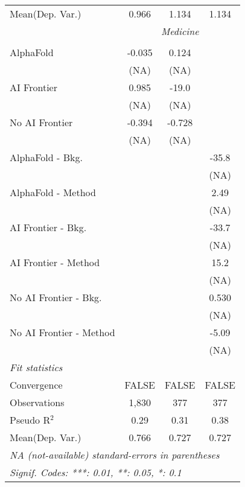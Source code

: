 \begin{tabular}{lccc}
Mean(Dep. Var.) & 0.966 & 1.134 & 1.134 \\
 & \multicolumn{3}{c}{\textit{Medicine}} \\ \\
   AlphaFold               & -0.035 & 0.124  &   \\   
                           & (NA)   & (NA)   &   \\   
   AI Frontier             & 0.985  & -19.0  &   \\   
                           & (NA)   & (NA)   &   \\   
   No AI Frontier          & -0.394 & -0.728 &   \\   
                           & (NA)   & (NA)   &   \\   
   AlphaFold - Bkg.        &        &        & -35.8\\   
                           &        &        & (NA)\\   
   AlphaFold - Method      &        &        & 2.49\\   
                           &        &        & (NA)\\   
   AI Frontier - Bkg.      &        &        & -33.7\\   
                           &        &        & (NA)\\   
   AI Frontier - Method    &        &        & 15.2\\   
                           &        &        & (NA)\\   
   No AI Frontier - Bkg.   &        &        & 0.530\\   
                           &        &        & (NA)\\   
   No AI Frontier - Method &        &        & -5.09\\   
                           &        &        & (NA)\\   
   \midrule
   \emph{Fit statistics}\\
   Convergence             &FALSE   & FALSE  & FALSE\\  
   Observations            & 1,830  & 377    & 377\\  
   Pseudo R$^2$            & 0.29   & 0.31   & 0.38\\  
Mean(Dep. Var.) & 0.766 & 0.727 & 0.727 \\
   \midrule \midrule
   \multicolumn{4}{l}{\emph{NA (not-available) standard-errors in parentheses}}\\
   \multicolumn{4}{l}{\emph{Signif. Codes: ***: 0.01, **: 0.05, *: 0.1}}\\
\end{tabular}
\par\endgroup
